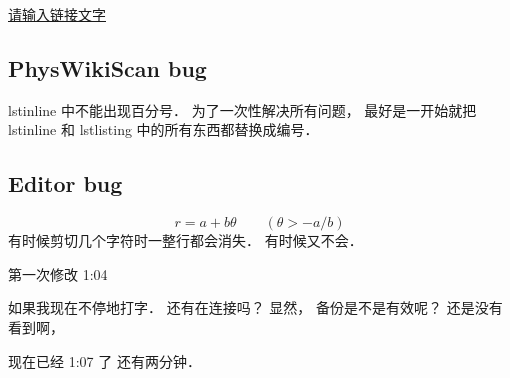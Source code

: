 

\href{http://www.example.com}{请输入链接文字}

\subsection{PhysWikiScan bug}
lstinline 中不能出现百分号． 为了一次性解决所有问题， 最好是一开始就把 lstinline 和 lstlisting 中的所有东西都替换成编号．

\subsection{Editor bug}
\begin{equation}
r = a + b\theta \qquad (\theta > -a/b)
\end{equation}
有时候剪切几个字符时一整行都会消失． 有时候又不会．

第一次修改 1:04

如果我现在不停地打字． 还有在连接吗？ 显然， 备份是不是有效呢？
还是没有看到啊， 

现在已经 1:07 了
还有两分钟．